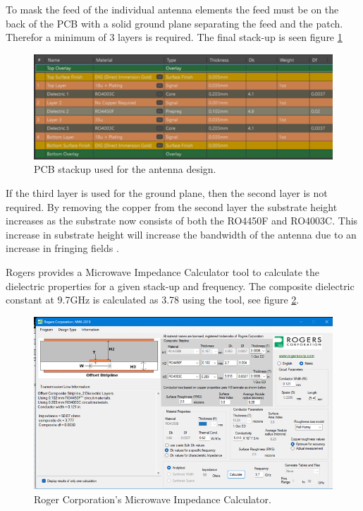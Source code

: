 To mask the feed of the individual antenna elements the feed must be on the back of the PCB with a solid ground plane separating the feed and the patch. Therefor a minimum of 3 layers is required. The final stack-up is seen figure \ref{fig:chp3_stackup}

    \begin{figure}[H]
    \centering
    \includegraphics[width=0.8\linewidth]{Figures/chp3_stackup.png}
    \caption{PCB stackup used for the antenna design.}
    \label{fig:chp3_stackup}
    \end{figure}

If the third layer is used for the ground plane, then the second layer is not required. By removing the copper from the second layer the substrate height increases as the substrate now consists of both the RO4450F and RO4003C. This increase in substrate height will increase the bandwidth of the antenna due to an increase in fringing fields \cite{Fringing}.

Rogers provides a Microwave Impedance Calculator tool to calculate the dielectric properties for a given stack-up and frequency. The composite dielectric constant at 9.7GHz is calculated as 3.78 using the tool, see figure \ref{fig:chp3_MWI}. 

    \begin{figure}[H]
    \centering
    \includegraphics[width=0.8\linewidth]{Figures/chp3_MWI.png}
    \caption{Roger Corporation's Microwave Impedance Calculator.}
    \label{fig:chp3_MWI}
    \end{figure}


